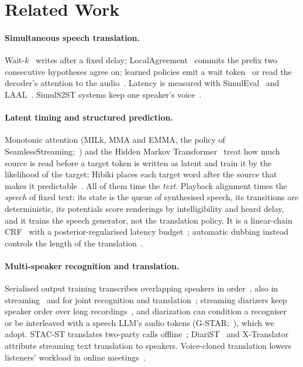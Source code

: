 \section{Related Work}
\label{sec:related}

\paragraph{Simultaneous speech translation.} Wait-$k$~\citep{ma2019stacl} writes after a fixed delay;
LocalAgreement~\citep{liu2020low,polak2022cuni,machacek2023turning} commits the prefix two consecutive hypotheses agree
on; learned policies emit a wait token~\citep{koshkin2024transllama} or read the decoder's attention to the
audio~\citep{papi2023edatt,papi2024streamatt}. Latency is measured with SimulEval~\citep{ma2020simuleval} and
LAAL~\citep{papi2022over}. SimulS2ST systems
keep one speaker's voice~\citep{zhang2024streamspeech,seamless2023,labiausse2025hibiki,cheng2025liveinterpret,he2026simuls2st,deng2025simuls2s}.

\paragraph{Latent timing and structured prediction.} Monotonic attention (MILk, MMA and EMMA, the policy of
SeamlessStreaming;~\citealp{arivazhagan2019milk,ma2020mma,ma2023emma}) and the Hidden Markov
Transformer~\citep{zhang2023hmt} treat how much source is read before a target token is written as latent and train it
by the likelihood of the target; Hibiki places each target word after the source that makes it
predictable~\citep{labiausse2025hibiki}. All of them time the \emph{text}. Playback alignment times the \emph{speech} of
fixed text: its state is the queue of synthesised speech, its transitions are deterministic, its potentials score
renderings by intelligibility and heard delay, and it trains the speech generator, not the translation policy. It is a
linear-chain CRF~\citep{lafferty2001crf} with a posterior-regularised latency budget~\citep{ganchev2010posterior};
automatic dubbing instead controls the length of the translation~\citep{lakew2022isometric}.

\paragraph{Multi-speaker recognition and translation.} Serialised output training transcribes overlapping speakers
in order~\citep{kanda2020sot,kanda2021saasr}, also in streaming~\citep{kanda2022tsot} and for joint recognition and
translation~\citep{papi2023tsot}; streaming diarizers keep speaker order over long
recordings~\citep{park2024sortformer,medennikov2025streaming}, and diarization can condition a
recogniser~\citep{polok2026dicow,huo2026tagspeech} or be interleaved with a speech LLM's audio tokens
(G-STAR;~\citealp{peng2026gstar}), which we adopt. STAC-ST translates two-party calls offline~\citep{zuluaga2023stac};
DiariST~\citep{yang2024diarist} and X-Translator~\citep{zhao2026xtranslator} attribute streaming text translation to
speakers. Voice-cloned translation lowers listeners' workload in online meetings~\citep{ma2026samevoice}.
